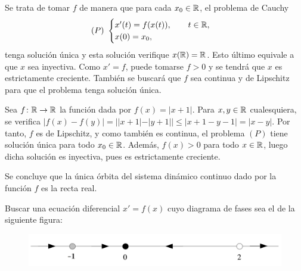 \documentclass[11pt]{report}
\begin{document}
\begin{solution}
    Se trata de tomar $f$ de manera que para cada $x_0\in\mathbb R$, el problema de Cauchy
    \[(P) \ \begin{cases}
        x'(t)=f(x(t)), \qquad t \in\mathbb R, \\
        x(0) = x_0,
    \end{cases}\]
    tenga solución única y esta solución verifique $x(\mathbb R) = \mathbb R$. Esto último equivale a que $x$ sea inyectiva. Como $x'=f$, puede tomarse $f > 0$ y se tendrá que $x$ es estrictamente creciente. También se buscará que $f$ sea continua y de Lipschitz para que el problema tenga solución única.

    Sea $f \colon \mathbb R \to \mathbb R$ la función dada por $f(x) =|x+1|$. Para $x,y\in\mathbb R$ cualesquiera, se verifica $|f(x)-f(y)| = ||x+1|-|y+1||\leq |x+1-y-1| = |x-y|$. Por tanto, $f$ es de Lipschitz, y como también es continua, el problema $(P)$ tiene solución única para todo $x_0\in\mathbb R$. Además, $f(x) >0$ para todo $x \in\mathbb R$, luego dicha solución es inyectiva, pues es estrictamente creciente.

    Se concluye que la única órbita del sistema dinámico continuo dado por la función $f$ es la recta real.
\end{solution}

\begin{exercise}
    Buscar una ecuación diferencial $x'=f(x)$ cuyo diagrama de fases sea el de la siguiente figura:
    \begin{figure}[H]
        \centering
        \includegraphics[scale = 0.2]{img/1.png}
    \end{figure}
\end{exercise}
\end{document}

